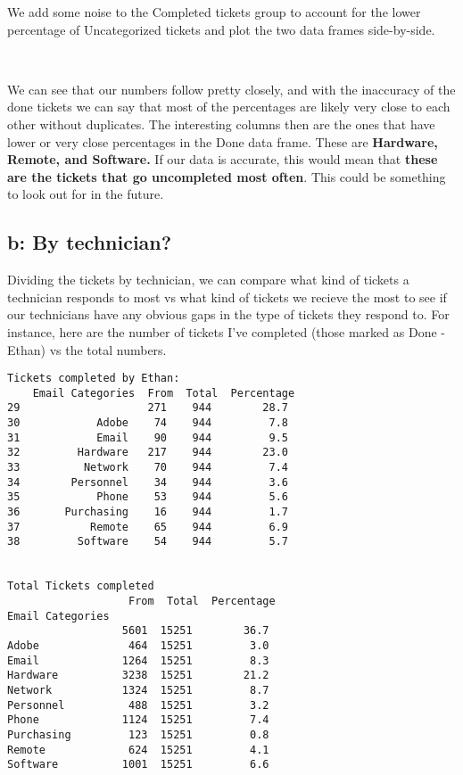 \documentclass[11pt]{article}
\begin{document}
    We add some noise to the Completed tickets group to account for the
lower percentage of Uncategorized tickets and plot the two data frames
side-by-side.

    \begin{center}
    \end{center}
    { \hspace*{\fill} \\}
    
    We can see that our numbers follow pretty closely, and with the
inaccuracy of the done tickets we can say that most of the percentages
are likely very close to each other without duplicates. The interesting
columns then are the ones that have lower or very close percentages in
the Done data frame. These are \textbf{Hardware, Remote, and Software.}
If our data is accurate, this would mean that \textbf{these are the
tickets that go uncompleted most often}. This could be something to look
out for in the future.

    \hypertarget{b-by-technician}{%
\subsection{b: By technician?}\label{b-by-technician}}

    Dividing the tickets by technician, we can compare what kind of tickets
a technician responds to most vs what kind of tickets we recieve the
most to see if our technicians have any obvious gaps in the type of
tickets they respond to. For instance, here are the number of tickets
I've completed (those marked as Done - Ethan) vs the total numbers.


    \begin{Verbatim}[commandchars=\\\{\}]
Tickets completed by Ethan:
    Email Categories  From  Total  Percentage
29                    271    944        28.7
30            Adobe    74    944         7.8
31            Email    90    944         9.5
32         Hardware   217    944        23.0
33          Network    70    944         7.4
34        Personnel    34    944         3.6
35            Phone    53    944         5.6
36       Purchasing    16    944         1.7
37           Remote    65    944         6.9
38         Software    54    944         5.7


Total Tickets completed
                   From  Total  Percentage
Email Categories
                  5601  15251        36.7
Adobe              464  15251         3.0
Email             1264  15251         8.3
Hardware          3238  15251        21.2
Network           1324  15251         8.7
Personnel          488  15251         3.2
Phone             1124  15251         7.4
Purchasing         123  15251         0.8
Remote             624  15251         4.1
Software          1001  15251         6.6
    \end{Verbatim}
\end{document}
